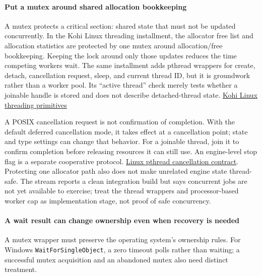 \paragraph{Put a mutex around shared allocation bookkeeping}\label{put-a-mutex-around-shared-allocation-bookkeeping}

A mutex protects a critical section: shared state that must not be updated concurrently. In the Kohi Linux threading installment, the allocator free list and allocation statistics are protected by one mutex around allocation/free bookkeeping. Keeping the lock around only those updates reduces the time competing workers wait. The same installment adds pthread wrappers for create, detach, cancellation request, sleep, and current thread ID, but it is groundwork rather than a worker pool. Its ``active thread'' check merely tests whether a joinable handle is stored and does not describe detached-thread state. \href{https://www.youtube.com/watch?v=NxtqrN6Jw-4}{Kohi Linux threading primitives}

A POSIX cancellation request is not confirmation of completion. With the default deferred cancellation mode, it takes effect at a cancellation point; state and type settings can change that behavior. For a joinable thread, join it to confirm completion before releasing resources it can still use. An engine-level stop flag is a separate cooperative protocol. \href{https://man7.org/linux/man-pages/man3/pthread_cancel.3.html}{Linux pthread cancellation contract}. Protecting one allocator path also does not make unrelated engine state thread-safe. The stream reports a clean integration build but says concurrent jobs are not yet available to exercise; treat the thread wrappers and processor-based worker cap as implementation stage, not proof of safe concurrency.

\paragraph{A wait result can change ownership even when recovery is needed}\label{a-wait-result-can-change-ownership-even-when-recovery-is-needed}

A mutex wrapper must preserve the operating system's ownership rules. For Windows \texttt{WaitForSingleObject}, a zero timeout polls rather than waiting; a successful mutex acquisition and an abandoned mutex also need distinct treatment.

